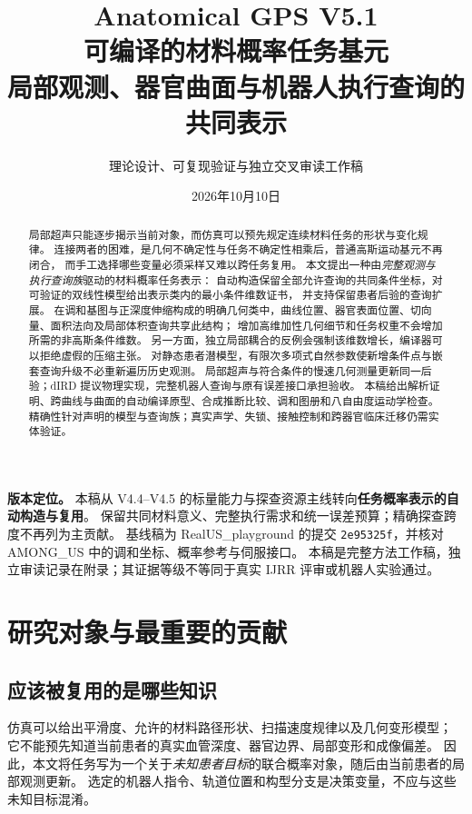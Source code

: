 \documentclass[11pt,a4paper]{article}
\numberwithin{equation}{section}
\theoremstyle{definition}
\begin{document}
\title{\color{inkblue}Anatomical GPS V5.1\\[3mm]
\LARGE 可编译的材料概率任务基元\\[3mm]
\large 局部观测、器官曲面与机器人执行查询的共同表示}
\author{理论设计、可复现验证与独立交叉审读工作稿}
\date{2026年10月10日}
\maketitle
\begin{abstract}
局部超声只能逐步揭示当前对象，而仿真可以预先规定连续材料任务的形状与变化规律。
连接两者的困难，是几何不确定性与任务不确定性相乘后，普通高斯运动基元不再闭合，
而手工选择哪些变量必须采样又难以跨任务复用。
本文提出一种由\emph{完整观测与执行查询族}驱动的材料概率任务表示：
自动构造保留全部允许查询的共同条件坐标，对可验证的双线性模型给出表示类内的最小条件维数证书，
并支持保留患者后验的查询扩展。
在调和基图与正深度伸缩构成的明确几何类中，曲线位置、器官表面位置、切向量、面积法向及局部体积查询共享此结构；
增加高维加性几何细节和任务权重不会增加所需的非高斯条件维数。
另一方面，独立局部耦合的反例会强制该维数增长，编译器可以拒绝虚假的压缩主张。
对静态患者潜模型，有限次多项式自然参数使新增条件点与嵌套查询升级不必重新遍历历史观测。
局部超声与符合条件的慢速几何测量更新同一后验；dIRD 提议物理实现，完整机器人查询与原有误差接口承担验收。
本稿给出解析证明、跨曲线与曲面的自动编译原型、合成推断比较、调和图册和八自由度运动学检查。
精确性针对声明的模型与查询族；真实声学、失锁、接触控制和跨器官临床迁移仍需实体验证。
\end{abstract}

\noindent\textbf{版本定位。}
本稿从 V4.4--V4.5 的标量能力与探查资源主线转向\textbf{任务概率表示的自动构造与复用}。
保留共同材料意义、完整执行需求和统一误差预算；精确探查跨度不再列为主贡献。
基线稿为 RealUS\_playground 的提交 \texttt{2e95325f}，并核对 AMONG\_US 中的调和坐标、概率参考与伺服接口。
本稿是完整方法工作稿，独立审读记录在附录；其证据等级不等同于真实 IJRR 评审或机器人实验通过。

\newpage
\tableofcontents
\newpage

\section{研究对象与最重要的贡献}
\label{sec:main}

\subsection{应该被复用的是哪些知识}
仿真可以给出平滑度、允许的材料路径形状、扫描速度规律以及几何变形模型；
它不能预先知道当前患者的真实血管深度、器官边界、局部变形和成像偏差。
因此，本文将任务写为一个关于\emph{未知患者目标}的联合概率对象，随后由当前患者的局部观测更新。
选定的机器人指令、轨道位置和构型分支是决策变量，不应与这些未知目标混淆。
\end{document}
